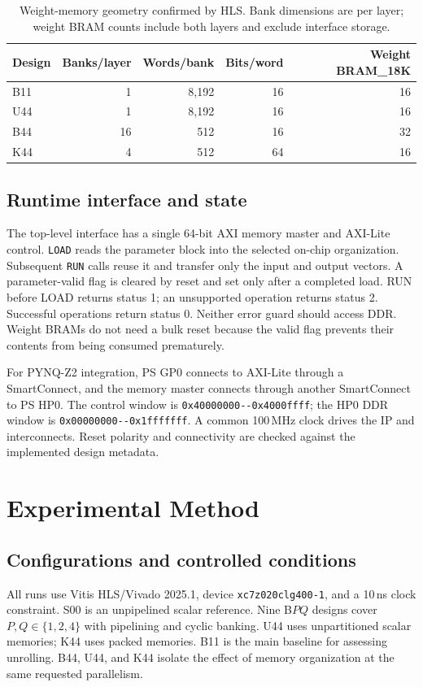 \documentclass[11pt,letterpaper]{article}
\DeclareRobustCommand{\code}[1]{\nolinkurl{#1}}
\begin{document}
\begin{table}[tb]
\centering
\small
\caption{Weight-memory geometry confirmed by HLS. Bank dimensions are per
layer; weight BRAM counts include both layers and exclude interface storage.}
\label{tab:geometry}
\begin{tabular}{lrrrr}
\toprule
Design & Banks/layer & Words/bank & Bits/word & Weight BRAM\_18K\\
\midrule
B11 & 1 & 8,192 & 16 & 16\\
U44 & 1 & 8,192 & 16 & 16\\
B44 & 16 & 512 & 16 & 32\\
K44 & 4 & 512 & 64 & 16\\
\bottomrule
\end{tabular}
\end{table}

\subsection{Runtime interface and state}
The top-level interface has a single 64-bit AXI memory master and AXI-Lite
control. \code{LOAD} reads the parameter block into the selected on-chip
organization. Subsequent \code{RUN} calls reuse it and transfer only the input
and output vectors. A parameter-valid flag is cleared by reset and set only
after a completed load. RUN before LOAD returns status 1; an unsupported
operation returns status 2. Successful operations return status 0. Neither
error guard should access DDR. Weight BRAMs do not need a bulk reset because the
valid flag prevents their contents from being consumed prematurely.

For PYNQ-Z2 integration, PS GP0 connects to AXI-Lite through a SmartConnect,
and the memory master connects through another SmartConnect to PS HP0. The
control window is \code{0x40000000--0x4000ffff}; the HP0 DDR window is
\code{0x00000000--0x1fffffff}. A common 100\,MHz clock drives the IP and
interconnects. Reset polarity and connectivity are checked against the
implemented design metadata.

\section{Experimental Method}
\subsection{Configurations and controlled conditions}
All runs use Vitis HLS/Vivado 2025.1, device \code{xc7z020clg400-1}, and a 10\,ns
clock constraint. S00 is an unpipelined scalar reference. Nine B$PQ$ designs
cover $P,Q\in\{1,2,4\}$ with pipelining and cyclic banking. U44 uses
unpartitioned scalar memories; K44 uses packed memories. B11 is the main
baseline for assessing unrolling. B44, U44, and K44 isolate the effect of memory
organization at the same requested parallelism.
\end{document}
